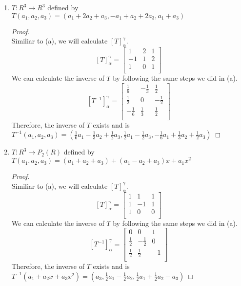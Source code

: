 \documentclass[11pt]{scrartcl}
\begin{document}
\begin{enumerate}[label=\alph*.]
	\item{
	$T:R^3 \rightarrow R^3$ defined by $T(a_1, a_2, a_3) =
	(a_1 + 2a_2 + a_3, -a_1 + a_2 + 2a_3, a_1 + a_3)$ 
	\begin{proof}
	\-\\
	Similiar to (a), we will calculate $[T]_{\alpha}^{\gamma}$.
	\[
	[T]_{\alpha}^{\gamma} = 
	\begin{bmatrix}
		1 & 2 & 1\\
		-1 & 1 & 2\\
		1 & 0 & 1 \\
	\end{bmatrix}
	\]
	We can calculate the inverse of $T$ by following the same steps we did in (a).
	\[
	[T^{-1}]_{\alpha}^{\gamma} = 
	\begin{bmatrix}
		\frac16 & -\frac13 & \frac12\\
		\frac12 & 0 & -\frac12\\
		-\frac16 & \frac13 & \frac12 \\
	\end{bmatrix}
	\]
	Therefore, the inverse of $T$ exists and is \\$T^{-1}(a_1, a_2, a_3) 
	=(\frac16a_1 -\frac13a_2 + \frac12a_3,\frac12a_1 -\frac12a_3,
	-\frac16a_1 + \frac13a_2 + \frac12a_3)$
	\end{proof}
	}

	\item{
		$T:R^3 \rightarrow P_2(R)$ defined by $T(a_1, a_2, a_3) =
		(a_1 + a_2 + a_3) + (a_1 - a_2 + a_3)x + a_1x^2$ 
		\begin{proof}
		\-\\
		Similiar to (a), we will calculate $[T]_{\alpha}^{\gamma}$.
		\[
		[T]_{\alpha}^{\gamma} = 
		\begin{bmatrix}
			1 & 1 & 1\\
			1 & -1 & 1\\
			1 & 0 & 0 \\
		\end{bmatrix}
		\]
		We can calculate the inverse of $T$ by following the same steps we did in (a).
		\[
		[T^{-1}]_{\alpha}^{\gamma} = 
		\begin{bmatrix}
			0 & 0 & 1\\
			\frac12 & -\frac12 & 0\\
			\frac12 & \frac12 & -1\\
		\end{bmatrix}
		\]
		Therefore, the inverse of $T$ exists and is \\$T^{-1}(a_1 + a_2x + a_3x^2) 
		=(a_3, \frac12a_1 - \frac12a_2, \frac12a_1 + \frac12a_2 -a_3)$
		\end{proof}
	
}
\end{enumerate}
\end{document}

